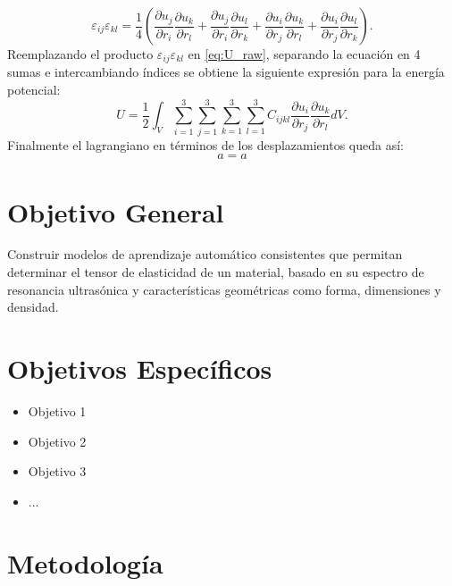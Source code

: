 \documentclass[12pt]{article}
\begin{document}
\begin{equation}
	\varepsilon_{ij}\varepsilon_{kl} = \frac{1}{4} \left(\frac{\partial u_j}{\partial r_i} \frac{\partial u_k}{\partial r_l} + \frac{\partial u_j}{\partial r_i} \frac{\partial u_l}{\partial r_k}+\frac{\partial u_i}{\partial r_j} \frac{\partial u_k}{\partial r_l}+\frac{\partial u_i}{\partial r_j} \frac{\partial u_l}{\partial r_k} \right).
\end{equation}
Reemplazando el producto $\varepsilon_{ij}\varepsilon_{kl}$ en \ref{eq:U_raw}, separando la ecuación en 4 sumas e intercambiando índices se obtiene la siguiente expresión para la energía potencial:
\begin{equation}
	U = \frac{1}{2} \int_{V}{\sum_{i=1}^{3}\sum_{j=1}^{3}\sum_{k=1}^{3}\sum_{l=1}^{3}{C_{ijkl}\frac{\partial u_i}{\partial r_j} \frac{\partial u_k}{\partial r_l}}dV}.
	\label{eq:U_cooked}
\end{equation}
Finalmente el lagrangiano en términos de los desplazamientos queda así: 
\begin{equation}
	a = a
\end{equation}

\section{Objetivo General}

Construir modelos de aprendizaje automático consistentes que permitan determinar el tensor de elasticidad de un material, basado en su espectro de resonancia ultrasónica y características geométricas como forma, dimensiones y densidad.
\section{Objetivos Específicos}


\begin{itemize}
	\item Objetivo 1
	\item Objetivo 2
	\item Objetivo 3
	\item ...
\end{itemize}

\section{Metodología}

\end{document}
